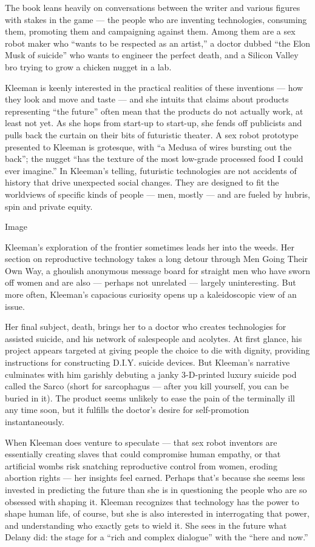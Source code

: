 The book leans heavily on conversations between the writer and various
figures with stakes in the game --- the people who are inventing
technologies, consuming them, promoting them and campaigning against
them. Among them are a sex robot maker who ``wants to be respected as an
artist,'' a doctor dubbed ``the Elon Musk of suicide'' who wants to
engineer the perfect death, and a Silicon Valley bro trying to grow a
chicken nugget in a lab.

Kleeman is keenly interested in the practical realities of these
inventions --- how they look and move and taste --- and she intuits that
claims about products representing ``the future'' often mean that the
products do not actually work, at least not yet. As she hops from
start-up to start-up, she fends off publicists and pulls back the
curtain on their bits of futuristic theater. A sex robot prototype
presented to Kleeman is grotesque, with ``a Medusa of wires bursting out
the back''; the nugget ``has the texture of the most low-grade processed
food I could ever imagine.'' In Kleeman's telling, futuristic
technologies are not accidents of history that drive unexpected social
changes. They are designed to fit the worldviews of specific kinds of
people --- men, mostly --- and are fueled by hubris, spin and private
equity.

Image

Kleeman's exploration of the frontier sometimes leads her into the
weeds. Her section on reproductive technology takes a long detour
through Men Going Their Own Way, a ghoulish anonymous message board for
straight men who have sworn off women and are also --- perhaps not
unrelated --- largely uninteresting. But more often, Kleeman's capacious
curiosity opens up a kaleidoscopic view of an issue.

Her final subject, death, brings her to a doctor who creates
technologies for assisted suicide, and his network of salespeople and
acolytes. At first glance, his project appears targeted at giving people
the choice to die with dignity, providing instructions for constructing
D.I.Y. suicide devices. But Kleeman's narrative culminates with him
garishly debuting a janky 3-D-printed luxury suicide pod called the
Sarco (short for sarcophagus --- after you kill yourself, you can be
buried in it). The product seems unlikely to ease the pain of the
terminally ill any time soon, but it fulfills the doctor's desire for
self-promotion instantaneously.

When Kleeman does venture to speculate --- that sex robot inventors are
essentially creating slaves that could compromise human empathy, or that
artificial wombs risk snatching reproductive control from women, eroding
abortion rights --- her insights feel earned. Perhaps that's because she
seems less invested in predicting the future than she is in questioning
the people who are so obsessed with shaping it. Kleeman recognizes that
technology has the power to shape human life, of course, but she is also
interested in interrogating that power, and understanding who exactly
gets to wield it. She sees in the future what Delany did: the stage for
a ``rich and complex dialogue'' with the ``here and now.''

